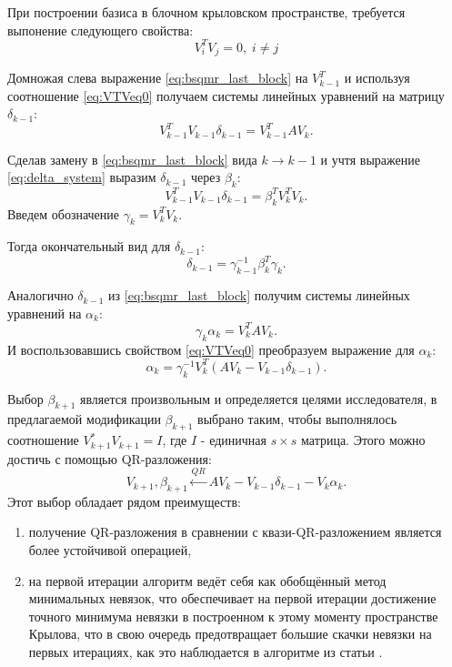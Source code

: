 При построении базиса в блочном крыловском пространстве, требуется выпонение следующего свойства:
\begin{equation}
    \label{eq:VTVeq0}
V_i^TV_j=0,\;i \neq j
\end{equation}  

Домножая слева выражение \eqref{eq:bsqmr_last_block} на $V_{k-1}^T$ и используя соотношение
\eqref{eq:VTVeq0} получаем системы линейных уравнений на матрицу $\delta_{k-1}$:
\begin{equation}
    \label{eq:delta_system}
    V_{k-1}^T V_{k-1} \delta_{k-1} = V_{k-1}^T A V_k.
\end{equation}

Сделав замену в \eqref{eq:bsqmr_last_block} вида $k \rightarrow k-1$ и учтя выражение 
\eqref{eq:delta_system} выразим $\delta_{k-1}$ через $\beta_k$:
\begin{equation*}
    V_{k-1}^T V_{k-1} \delta_{k-1} = \beta_{k}^T V_k^T V_k.
\end{equation*}
Введем обозначение $\gamma_k = V_k^T V_k$.

Тогда окончательный вид для $\delta_{k-1}$:
\begin{equation}
    \label{eq:delta_final}
    \delta_{k-1} = \gamma_{k-1}^{-1} \beta_k^T \gamma_k.
\end{equation}

Аналогично $\delta_{k-1}$ из \eqref{eq:bsqmr_last_block} получим системы линейных
уравнений на $\alpha_k$:
\begin{equation*}
    \gamma_k \alpha_k = V_k^T A V_k.
\end{equation*}
И воспользовавшись свойством \eqref{eq:VTVeq0} преобразуем выражение для $\alpha_k$:
\begin{equation}
    \alpha_k = \gamma_k^{-1} V_k^T (A V_k - V_{k-1} \delta_{k-1}).
\end{equation}

Выбор $\beta_{k+1}$ является произвольным и определяется целями исследователя, в 
предлагаемой модификации $\beta_{k+1}$ выбрано таким, чтобы выполнялось соотношение
$V_{k+1}^* V_{k+1} = I$, где $I$ - единичная $s \times s$ матрица. Этого можно достичь с помощью QR-разложения:
\begin{equation}
    \label{eq:Vkp1betakp1QR}
    V_{k+1}, \beta_{k+1} \xleftarrow{QR} A V_k - V_{k-1} \delta_{k-1} - V_k \alpha_k. 
\end{equation} 
Этот выбор обладает рядом преимуществ: \begin{enumerate}
    \item получение QR-разложения в сравнении с квази-QR-разложением является более устойчивой операцией, 
    \item на первой итерации алгоритм ведёт себя как обобщённый метод минимальных невязок, что обеспечивает на первой итерации достижение точного минимума невязки в построенном к этому моменту пространстве Крылова, что в свою очередь предотвращает большие скачки невязки на первых итерациях, как это наблюдается в алгоритме из статьи \cite{doi:10.1137/0917019}.
\end{enumerate}  


